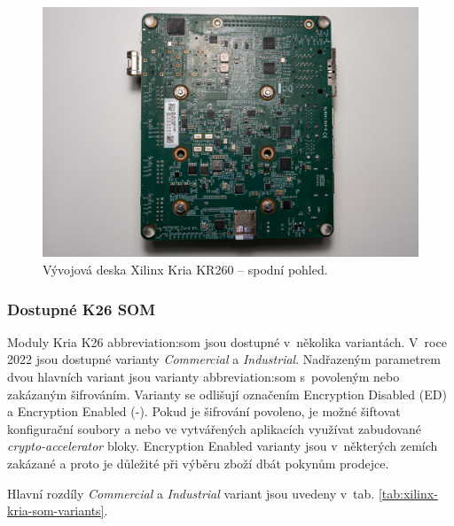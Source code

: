 \documentclass[a4paper, twoside, 11pt]{article}
\begin{document}
				\begin{figure}[H]
					\centering
						\includegraphics[width=1\textwidth]{src/jpg/xilinx-kria-foto-3.jpeg} 
						\caption{Vývojová deska Xilinx Kria KR260 – spodní pohled.}
						\label{fig:xilinx-kria-foto-3}
				\end{figure}
			
			
				\subsubsection{Dostupné K26 SOM}
					Moduly Kria K26 \gls{abbreviation:som} jsou dostupné v~několika variantách. V~roce 2022 jsou dostupné varianty \textit{Commercial} a \textit{Industrial}. Nadřazeným parametrem dvou hlavních variant jsou varianty \gls{abbreviation:som} s~povoleným nebo zakázaným šifrováním. Varianty se odlišují označením Encryption Disabled (ED) a Encryption Enabled (-). Pokud je šifrování povoleno, je možné šiftovat konfigurační soubory a nebo ve vytvářených aplikacích využívat zabudované \textit{crypto-accelerator} bloky. Encryption Enabled varianty jsou v~některých zemích zakázané a proto je důležité při výběru zboží dbát pokynům prodejce.
					\par Hlavní rozdíly \textit{Commercial} a \textit{Industrial} variant jsou uvedeny v~tab. \ref{tab:xilinx-kria-som-variants}.
\end{document}
